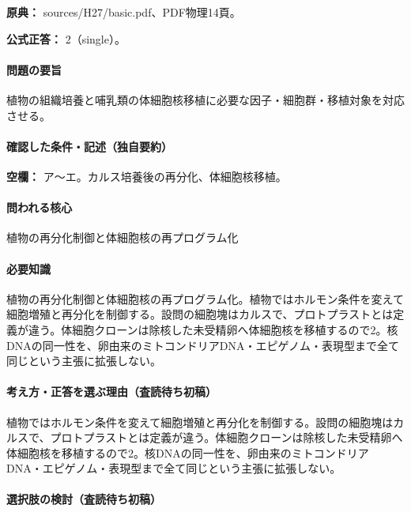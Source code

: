 \noindent\textbf{原典：} sources/H27/basic.pdf、PDF物理14頁。

\textbf{公式正答：} 2（single）。

\paragraph{問題の要旨} 植物の組織培養と哺乳類の体細胞核移植に必要な因子・細胞群・移植対象を対応させる。

\paragraph{確認した条件・記述（独自要約）}\mbox{}\par

\noindent\textbf{空欄：} ア〜エ。カルス培養後の再分化、体細胞核移植。\par

\paragraph{問われる核心} 植物の再分化制御と体細胞核の再プログラム化

\paragraph{必要知識} 植物の再分化制御と体細胞核の再プログラム化。植物ではホルモン条件を変えて細胞増殖と再分化を制御する。設問の細胞塊はカルスで、プロトプラストとは定義が違う。体細胞クローンは除核した未受精卵へ体細胞核を移植するので2。核DNAの同一性を、卵由来のミトコンドリアDNA・エピゲノム・表現型まで全て同じという主張に拡張しない。

\paragraph{考え方・正答を選ぶ理由（査読待ち初稿）} 植物ではホルモン条件を変えて細胞増殖と再分化を制御する。設問の細胞塊はカルスで、プロトプラストとは定義が違う。体細胞クローンは除核した未受精卵へ体細胞核を移植するので2。核DNAの同一性を、卵由来のミトコンドリアDNA・エピゲノム・表現型まで全て同じという主張に拡張しない。

\paragraph{選択肢の検討（査読待ち初稿）}\mbox{}\par

